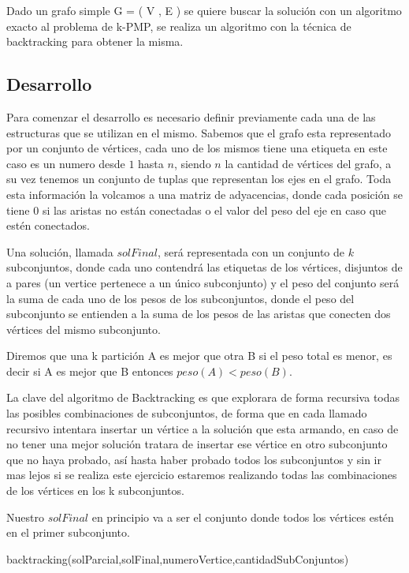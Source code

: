 Dado un grafo simple G = ( V , E ) se quiere buscar la solución con un algoritmo exacto al problema de k-PMP, se realiza un algoritmo con la técnica de backtracking para obtener la misma.

\subsection{Desarrollo}

Para comenzar el desarrollo es necesario definir previamente cada una de las estructuras que se utilizan en el mismo. Sabemos que el grafo esta representado por un conjunto de vértices, cada uno de los mismos tiene una etiqueta en este caso es un numero desde $1$ hasta $n$, siendo $n$ la cantidad de vértices del grafo, a su vez tenemos un conjunto de tuplas que representan los ejes en el grafo. Toda esta información la volcamos a una matriz de adyacencias, donde cada posición se tiene 0 si las aristas no están conectadas o el valor del peso del eje en caso que estén conectados.

Una solución, llamada $solFinal$, será representada con un conjunto de $k$ subconjuntos, donde cada uno contendrá las etiquetas de los vértices, disjuntos de a pares (un vertice pertenece a un único subconjunto) y el peso del conjunto será la suma de cada uno de los pesos de los subconjuntos, donde el peso del subconjunto se entienden a la suma de los pesos de las aristas que conecten dos vértices del mismo subconjunto.

Diremos que una k partición A es mejor que otra B si el peso total es menor, es decir si A es mejor que B entonces $peso(A) < peso(B)$. 

La clave del algoritmo de Backtracking es que explorara de forma recursiva todas las posibles combinaciones de subconjuntos, de forma que en cada llamado recursivo intentara insertar un vértice a la solución que esta armando, en caso de no tener una mejor solución tratara de insertar ese vértice en otro subconjunto que no haya probado, así hasta haber probado todos los subconjuntos y sin ir mas lejos si se realiza este ejercicio estaremos realizando todas las combinaciones de los vértices en los k subconjuntos.	

Nuestro $solFinal$ en principio va a ser el conjunto donde todos los vértices estén en el primer subconjunto.


\begin{algorithm}
  \begin{algorithmic}[1]\parskip=1mm
 \caption{ backtracking(solParcial,solFinal,numeroVertice,cantidadSubConjuntos)}
  \end{algorithmic}
  \end{algorithm}

